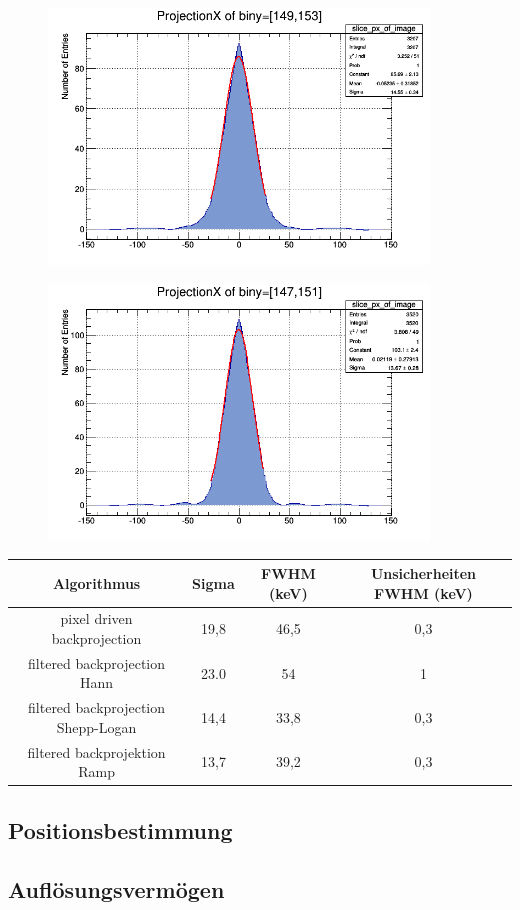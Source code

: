 \begin{figure}[h!]
	\centering
	\includegraphics[width=0.9\textwidth]{Shepp-Logan-Filter.png}
	\caption{}
	\label{}
\end{figure}
\begin{figure}[h!]
	\centering
	\includegraphics[width=0.9\textwidth]{Ramp-Filter.png}
	\caption{}
	\label{}
\end{figure}


\begin{tabular}{|c|c|c|c|}
	\hline 
	Algorithmus & Sigma & FWHM (keV) & Unsicherheiten FWHM (keV) \\ 
	\hline 
	pixel driven backprojection & 19,8 & 46,5 & 0,3 \\ 
	\hline 
	filtered backprojection Hann & 23.0 & 54 & 1  \\ 
	\hline 
	filtered backprojection Shepp-Logan & 14,4 & 33,8 & 0,3 \\ 
	\hline 
	filtered backprojektion Ramp & 13,7 & 39,2 & 0,3 \\ 
	\hline 
\end{tabular} 

\subsection{Positionsbestimmung}


\subsection{Auflösungsvermögen}